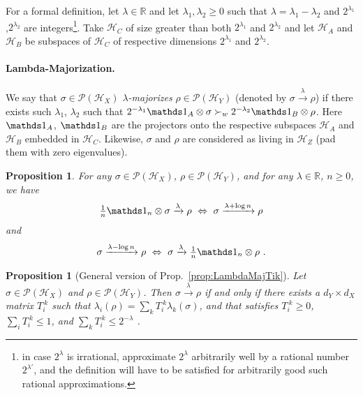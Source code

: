\documentclass[10pt,letterpaper]{article}
\theoremstyle{plain}
\newtheorem{prop}[thm]{Proposition}
\def\Hs{\mathscr{H}}%
\newcommand{\lambdamaj}[1]{\xrightarrow{#1}}
\newcommand{\POps}{\mathscr{P}}
\begin{document}
For a formal definition, let $\lambda\in\mathbb{R}$ and let $\lambda_1,\lambda_2\geqslant 0$ such that
$\lambda = \lambda_1-\lambda_2$ and $2^{\lambda_1}$,$2^{\lambda_2}$ are integers\footnote{in case $2^\lambda$ is
  irrational, approximate $2^\lambda$ arbitrarily well by a rational number $2^{\lambda'}$, and the definition
  will have to be satisfied for arbitrarily good such rational approximations.}.
Take $\Hs_C$ of size greater than both $2^{\lambda_1}$ and $2^{\lambda_2}$ and let $\Hs_A$ and $\Hs_B$ be subspaces
of $\Hs_C$ of respective dimensions $2^{\lambda_1}$ and $2^{\lambda_2}$.

\paragraph{Lambda-Majorization.} We say that $\sigma\in\POps(\Hs_X)$ {\em $\lambda$-majorizes}
$\rho\in\POps(\Hs_Y)$ (denoted by $\sigma\lambdamaj\lambda\rho$) if there exists such
$\lambda_1$, $\lambda_2$ such that
$2^{-\lambda_1}\Ident_A\otimes\sigma \succ_w 2^{-\lambda_2}\Ident_B\otimes\rho$.
Here $\Ident_A$, $\Ident_B$ are the projectors onto the respective subspaces $\Hs_A$ and $\Hs_B$
embedded in $\Hs_C$. Likewise, $\sigma$ and $\rho$ are considered as living in $\Hs_Z$ (pad them with zero
eigenvalues).

\begin{prop}
  \label{prop:LambdaMajMoveIdentitiesAround}
  For any $\sigma\in\POps(\Hs_X)$, $\rho\in\POps(\Hs_Y)$, and for any $\lambda\in\mathbb{R}$, $n\geqslant 0$, we have
  \begin{align*}
    {\textstyle\frac1n}\Ident_n\otimes\sigma\lambdamaj\lambda\rho  ~\Leftrightarrow~
    \sigma\lambdamaj{\lambda+\log n} \rho
  \end{align*}
  and
  \begin{align*}
    \sigma\lambdamaj{\lambda-\log n} \rho  ~\Leftrightarrow~
    \sigma\lambdamaj\lambda {\textstyle\frac1n}\Ident_n\otimes\rho\ .
  \end{align*}
\end{prop}

\begin{prop}[General version of Prop.~\ref{prop:LambdaMajTik}]
  \label{prop:LambdaMajTikFormal}
  Let $\sigma\in\POps(\Hs_X)$ and $\rho\in\POps(\Hs_Y)$. Then $\sigma\lambdamaj\lambda\rho$ if
  and only if there exists a $d_Y \times d_X$ matrix $T_i^{~k}$ such that
  $\lambda_i(\rho) = \sum_k T_i^{~k} \lambda_k(\sigma)$, and that satisfies
  $T_i^{~k}\geqslant 0$,
  $\sum_i T_i^{~k} \leqslant 1$, and
  $\sum_k T_i^{~k} \leqslant 2^{-\lambda}$ .
\end{prop}
\end{document}
